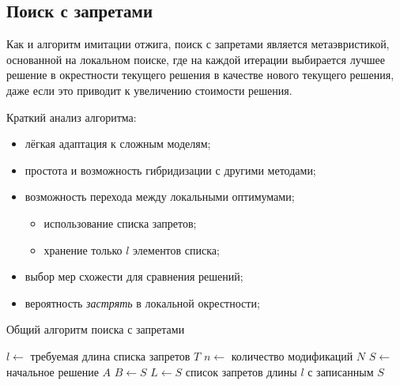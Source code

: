 \subsection{Поиск с запретами}
Как и алгоритм имитации отжига, поиск с запретами является метаэвристикой, основанной на локальном поиске, 
где на каждой итерации выбирается лучшее решение в окрестности текущего решения в качестве нового текущего 
решения, даже если это приводит к увеличению стоимости решения.

Краткий анализ алгоритма:
\begin{itemize}
    \item лёгкая адаптация к сложным моделям;
    \item простота и возможность гибридизации с другими методами;
    \item возможность перехода между локальными оптимумами;
    \begin{itemize}
        \item использование списка запретов;
        \item хранение только \( l \) элементов списка;
    \end{itemize}
    \item выбор мер схожести для сравнения решений;
    \item вероятность \emph{застрять} в локальной окрестности;
\end{itemize}

\begin{algorithm}[ht!]
    \caption{Общий алгоритм поиска с запретами}
    \( l \leftarrow \) требуемая длина списка запретов \( T \)\;
    \( n \leftarrow \) количество модификаций \( N \)\;
    \( S \leftarrow \) начальное решение \( A \)\;
    \( B \leftarrow S \)\;
    \( L \leftarrow { S } \) список запретов длины \( l \) с записанным \( S \)\;
    \label{alg:tabu-search}
\end{algorithm}

